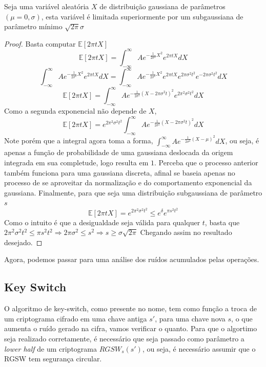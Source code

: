 \begin{lemma}
    Seja uma variável aleatória $X$ de distribuição gaussiana de parâmetros $(\mu = 0, \sigma)$, esta variável é limitada superiormente
    por um subgaussiana de parâmetro mínimo $\sqrt{2\pi}\sigma$
\end{lemma}
\begin{proof}
    Basta computar $\mathbb{E}[2\pi tX]$
    $$
    \mathbb{E}[2\pi tX] = \int_{-\infty}^{\infty} Ae^{-\frac{1}{2\sigma^2}X^2} e^{2\pi tX}  dX
    $$
    $$
    \int_{-\infty}^{\infty} Ae^{-\frac{1}{2\sigma^2}X^2} e^{2\pi tX}dX  = \int_{-\infty}^{\infty} Ae^{-\frac{1}{2\sigma^2}X^2} e^{2\pi tX} e^{2\pi \sigma^2 t^2} e^{-2\pi \sigma^2 t^2}dX
    $$
    $$
    \mathbb{E}[2\pi tX] = \int_{-\infty}^{\infty} Ae^{-\frac{1}{2\sigma^2}(X - 2\pi \sigma^2 t)^2}  e^{2\pi^2 \sigma^2 t^2} dX
    $$
    Como a segunda exponencial não depende de $X$, 
    $$
    \mathbb{E}[2\pi tX] = e^{2\pi^2 \sigma^2 t^2} \int_{-\infty}^{\infty} Ae^{-\frac{1}{2\sigma^2}(X - 2\pi \sigma^2 t)^2} dX
    $$
    Note porém que a integral agora toma a forma, $\int_{-\infty}^{\infty} Ae^{-\frac{1}{2\sigma^2}(X - \mu)^2} dX$, ou seja,
    é apenas a função de probabilidade de uma gaussiana deslocada da origem integrada em sua completude, logo resulta em $1$.
    Perceba que o processo anterior também funciona para uma gaussiana discreta, afinal se baseia apenas no processo de se aproveitar
    da normalização e do comportamento exponencial da gaussiana. Finalmente, para que seja uma distribuição subgaussiana de parâmetro $s$
    $$
    \mathbb{E}[2\pi tX] = e^{2\pi^2 \sigma^2 t^2} \le e^\delta e^{\pi s^2 t^2}
    $$
    Como o intuito é que a desigualdade seja válida para qualquer $t$, basta que $ 2\pi^2 \sigma^2 t^2 \le \pi s^2 t^2 \Rightarrow 2\pi \sigma^2 \le s^2 \Rightarrow s \ge \sigma \sqrt{2\pi}$
    Chegando assim no resultado desejado. 


\end{proof}

Agora, podemos passar para uma análise dos ruídos acumulados pelas operações.

\subsection{Key Switch}
O algoritmo de key-switch, como presente no nome, tem como função a troca de um criptograma cifrado
em uma chave antiga $s'$, para uma chave nova $s$, o que aumenta o ruído gerado na cifra, vamos verificar o quanto.
Para que o algortimo seja realizado corretamente, é necessário 
que seja passado como parâmetro a \textit{lower half} de um criptograma $RGSW_s(s')$, ou seja, é necessário assumir 
que o RGSW tem segurança circular.

